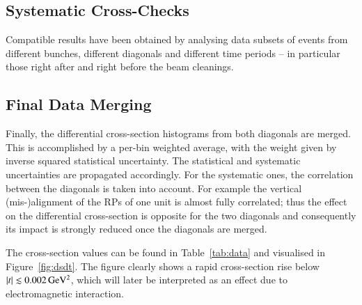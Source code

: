 
\subsection{Systematic Cross-Checks}
\label{sec:cross checks}

Compatible results have been obtained by analysing data subsets of events from different bunches, different diagonals and different time periods -- in particular those right after and right before the beam cleanings.



\subsection{Final Data Merging}
\label{sec:final data merging}

Finally, the differential cross-section histograms from both diagonals are merged. This is accomplished by a per-bin weighted average, with the weight given by inverse squared statistical uncertainty. The statistical and systematic uncertainties are propagated accordingly. For the systematic ones, the correlation between the diagonals is taken into account. For example the vertical (mis-)alignment of the RPs of one unit is almost fully correlated; thus the effect on the differential cross-section is opposite for the two diagonals and consequently its impact is strongly reduced once the diagonals are merged.

The cross-section values can be found in Table~\ref{tab:data} and visualised in Figure~\ref{fig:dsdt}. The figure clearly shows a rapid cross-section rise below $|t| \lesssim 0.002\,{\rm GeV^2}$, which will later be interpreted as an effect due to electromagnetic interaction.



